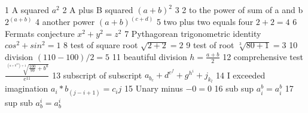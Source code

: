\documentclass{article}
\begin{document}
1 A squared
$a^2$
2 A plus B squared
$(a + b)^2$
3 2 to the power of sum of a and b
$2^(a + b)$
4 another power
$(a + b)^(c + d)$
5 two plus two equals four
$2+2=4$
6 Fermats conjecture
$x^2 + y^2 = z^2$
7 Pythagorean trigonometric identity
$cos^2 + sin^2 = 1$
8 test of square root
$\sqrt{2 + 2} = 2$
9 test of root
$\sqrt[3]{80 + 1} = 3$
10 division
$(110 - 100) / 2 = 5$
11 beautiful division
$h = \frac{a + b}{2}$
12 comprehensive test
$\frac{\sqrt[(a + b^10) + 1]{\frac{100}{99} + b^a}}{e^11}$
13 subscript of subscript
$a_{b_c} + d^{e^f} + g^h^i + j_k_l$
14 I exceeded imagination
$a_i * b_(j - i + 1) = c_ij$
15 Unary minus
$-0 = 0$
16 sub sup
$a_i^b = a_{i}^{b}$
17 sup sub
$a^i_b = a^{i}_{b}$
\end{document}
